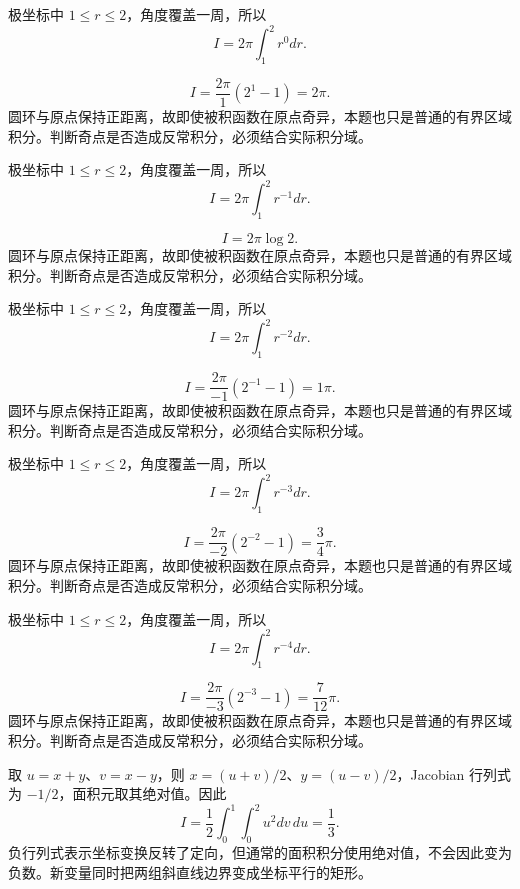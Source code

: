 \documentclass[UTF8,12pt,a4paper,fontset=fandol]{ctexart}
\begin{document}
\begin{solve}\label{ans:c37q14}
极坐标中 $1\le r\le2$，角度覆盖一周，所以
\[
I=2\pi\int_1^2r^{0}dr.
\]

\[
I=\frac{2\pi}{1}(2^{1}-1)=2\pi.
\]
圆环与原点保持正距离，故即使被积函数在原点奇异，本题也只是普通的有界区域积分。判断奇点是否造成反常积分，必须结合实际积分域。
\end{solve}

\begin{solve}\label{ans:c37q15}
极坐标中 $1\le r\le2$，角度覆盖一周，所以
\[
I=2\pi\int_1^2r^{-1}dr.
\]

\[
I=2\pi\log2.
\]
圆环与原点保持正距离，故即使被积函数在原点奇异，本题也只是普通的有界区域积分。判断奇点是否造成反常积分，必须结合实际积分域。
\end{solve}

\begin{solve}\label{ans:c37q16}
极坐标中 $1\le r\le2$，角度覆盖一周，所以
\[
I=2\pi\int_1^2r^{-2}dr.
\]

\[
I=\frac{2\pi}{-1}(2^{-1}-1)=1\pi.
\]
圆环与原点保持正距离，故即使被积函数在原点奇异，本题也只是普通的有界区域积分。判断奇点是否造成反常积分，必须结合实际积分域。
\end{solve}

\begin{solve}\label{ans:c37q17}
极坐标中 $1\le r\le2$，角度覆盖一周，所以
\[
I=2\pi\int_1^2r^{-3}dr.
\]

\[
I=\frac{2\pi}{-2}(2^{-2}-1)=\frac{3}{4}\pi.
\]
圆环与原点保持正距离，故即使被积函数在原点奇异，本题也只是普通的有界区域积分。判断奇点是否造成反常积分，必须结合实际积分域。
\end{solve}

\begin{solve}\label{ans:c37q18}
极坐标中 $1\le r\le2$，角度覆盖一周，所以
\[
I=2\pi\int_1^2r^{-4}dr.
\]

\[
I=\frac{2\pi}{-3}(2^{-3}-1)=\frac{7}{12}\pi.
\]
圆环与原点保持正距离，故即使被积函数在原点奇异，本题也只是普通的有界区域积分。判断奇点是否造成反常积分，必须结合实际积分域。
\end{solve}

\begin{solve}\label{ans:c37q19}
取 $u=x+y$、$v=x-y$，则 $x=(u+v)/2$、$y=(u-v)/2$，Jacobian 行列式为 $-1/2$，面积元取其绝对值。因此
\[
I=\frac12\int_0^{1}\int_0^{2}u^2dv\,du=\frac{1}{3}.
\]
负行列式表示坐标变换反转了定向，但通常的面积积分使用绝对值，不会因此变为负数。新变量同时把两组斜直线边界变成坐标平行的矩形。
\end{solve}
\end{document}

